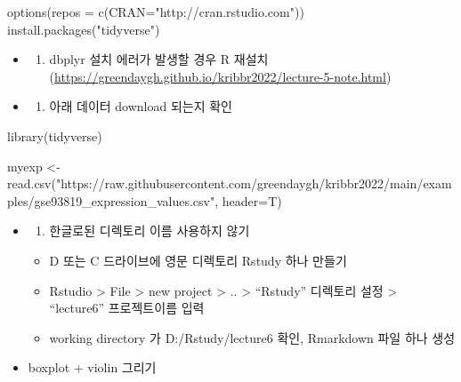 \documentclass[
]{book}
\newenvironment{Shaded}{\begin{snugshade}}{\end{snugshade}}
\newcommand{\AttributeTok}[1]{\textcolor[rgb]{0.77,0.63,0.00}{#1}}
\newcommand{\FunctionTok}[1]{\textcolor[rgb]{0.00,0.00,0.00}{#1}}
\newcommand{\NormalTok}[1]{#1}
\newcommand{\OtherTok}[1]{\textcolor[rgb]{0.56,0.35,0.01}{#1}}
\newcommand{\StringTok}[1]{\textcolor[rgb]{0.31,0.60,0.02}{#1}}
\providecommand{\tightlist}{%
  \setlength{\itemsep}{0pt}\setlength{\parskip}{0pt}}
\begin{document}
\begin{Shaded}
\begin{Highlighting}[]

\FunctionTok{options}\NormalTok{(}\AttributeTok{repos =} \FunctionTok{c}\NormalTok{(}\AttributeTok{CRAN=}\StringTok{"http://cran.rstudio.com"}\NormalTok{))}
\FunctionTok{install.packages}\NormalTok{(}\StringTok{"tidyverse"}\NormalTok{)}
\end{Highlighting}
\end{Shaded}

\begin{itemize}
\item
  \begin{enumerate}
  \def\labelenumi{\arabic{enumi})}
  \setcounter{enumi}{1}
  \tightlist
  \item
    dbplyr 설치 에러가 발생할 경우 R 재설치 (\url{https://greendaygh.github.io/kribbr2022/lecture-5-note.html})
  \end{enumerate}
\item
  \begin{enumerate}
  \def\labelenumi{\arabic{enumi})}
  \setcounter{enumi}{2}
  \tightlist
  \item
    아래 데이터 download 되는지 확인
  \end{enumerate}
\end{itemize}

\begin{Shaded}
\begin{Highlighting}[]
\FunctionTok{library}\NormalTok{(tidyverse)}

\NormalTok{myexp }\OtherTok{\textless{}{-}} \FunctionTok{read.csv}\NormalTok{(}\StringTok{"https://raw.githubusercontent.com/greendaygh/kribbr2022/main/examples/gse93819\_expression\_values.csv"}\NormalTok{, }\AttributeTok{header=}\NormalTok{T)}
\end{Highlighting}
\end{Shaded}

\begin{itemize}
\item
  \begin{enumerate}
  \def\labelenumi{\arabic{enumi})}
  \setcounter{enumi}{3}
  \tightlist
  \item
    한글로된 디렉토리 이름 사용하지 않기
  \end{enumerate}

  \begin{itemize}
  \tightlist
  \item
    D 또는 C 드라이브에 영문 디렉토리 Rstudy 하나 만들기
  \item
    Rstudio \textgreater{} File \textgreater{} new project \textgreater{} .. \textgreater{} ``Rstudy'' 디렉토리 설정 \textgreater{} ``lecture6'' 프로젝트이름 입력
  \item
    working directory 가 D:/Rstudy/lecture6 확인, Rmarkdown 파일 하나 생성
  \end{itemize}
\item
  boxplot + violin 그리기
\end{itemize}
\end{document}
